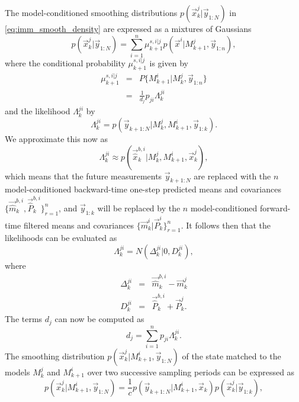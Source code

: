 The model-conditioned smoothing distributions
$p(\vec{x}_k^j|\vec{y}_{1:N})$ in \eqref{eq:imm_smooth_density} are
expressed as a mixtures of Gaussians
%
\begin{equation}
%
p(\vec{x}_k^j|\vec{y}_{1:N}) = \sum_{i=1}^{n} \mu_{k+1}^{s,i|j}
p(\vec{x}^i|M_{k+1}^j,\vec{y}_{1:n}), \label{eq:imm_smooth_modelcs}
%
\end{equation}
%
where the conditional probability $\mu_{k+1}^{s,i|j}$ is given by
%
\begin{eqnarray}
%
\mu_{k+1}^{s,i|j} & = & P\{ M_{k+1}^i| M_k^j, \vec{y}_{1:n}\} \\ & = &
\frac{1}{d_j} p_{ji} \Lambda_k^{ji}
%
\end{eqnarray}
%
and the likelihood $\Lambda_k^{ji}$ by
%
\begin{equation}
%
\Lambda_k^{ji} = p(\vec{y}_{k+1:N}|M_k^j,M_{k+1}^i,\vec{y}_{1:k}).
%
\end{equation}
%
We approximate this now as
%
\begin{equation}
%
\Lambda_k^{ji} \approx
p(\vec{\hat{x}}_k^{b,i}|M_k^j,M_{k+1}^i,\vec{x}_{k}^j),
%
\end{equation}
%
which means that the future measurements $\vec{y}_{k+1:N}$ are
replaced with the $n$ model-conditioned backward-time one-step
predicted means and covariances
$\{\vec{\hat{m}}_k^{b,i},\vec{\hat{P}}_k^{b,i}\}_{r=1}^{n}$, and
$\vec{y}_{1:k}$ will be replaced by the $n$ model-conditioned
forward-time filtered means and covariances
$\{\vec{m}_k^{i}|\vec{P}_k^{i}\}_{r=1}^{n}$. It follows then that the
likelihoods can be evaluated as
%
\begin{equation}
%
\Lambda_k^{ji} = N(\Delta_k^{ji}|0,D_k^{ji}),
%
\end{equation}
%
where
%
\begin{eqnarray}
%
\Delta_k^{ji} & = & \vec{\hat{m}}_k^{b,i} - \vec{m}_k^j \\
%
D_k^{ji} & = & \vec{\hat{P}}_k^{b,i} + \vec{P}_k^j.
%
\end{eqnarray}
%
The terms $d_j$ can now be computed as
%
\begin{equation}
%
d_j = \sum_{i=1}^n p_{ji} \Lambda_k^{ji}.
%
\end{equation}
% 
The smoothing distribution $p(\vec{x}_k^j|M_{k+1}^i,\vec{y}_{1:N})$ of
the state matched to the models $M_k^j$ and $M_{k+1}^i$ over two
successive sampling periods can be expressed as
%
\begin{equation}
%
p(\vec{x}_k^j|M_{k+1}^i,\vec{y}_{1:N}) = \frac{1}{c}
p(\vec{y}_{k+1:N}|M_{k+1}^i,\vec{x}_k) p(\vec{x}_k^j|\vec{y}_{1:k}),
%
\end{equation}
